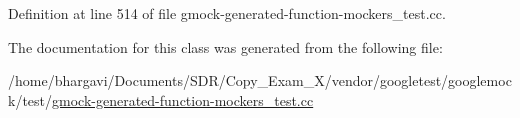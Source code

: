 Definition at line 514 of file gmock-\/generated-\/function-\/mockers\+\_\+test.\+cc.



The documentation for this class was generated from the following file\+:\begin{DoxyCompactItemize}
\item 
/home/bhargavi/\+Documents/\+S\+D\+R/\+Copy\+\_\+\+Exam\+\_\+X/vendor/googletest/googlemock/test/\hyperlink{gmock-generated-function-mockers__test_8cc}{gmock-\/generated-\/function-\/mockers\+\_\+test.\+cc}\end{DoxyCompactItemize}
